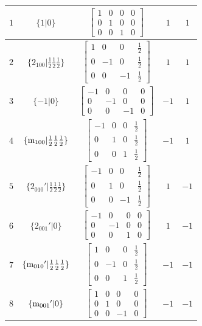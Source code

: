 \documentclass[fleqn,8pt]{jsarticle}
\begin{document}
\begin{longtable}{ccccc}
$ 1 $ & $ \{1|0\} $ & $ \begin{bmatrix} 1 & 0 & 0 & 0 \\ 0 & 1 & 0 & 0 \\ 0 & 0 & 1 & 0 \end{bmatrix} $ & $ 1 $ & $ 1 $ \\ \hline
$ 2 $ & $ \{2{}_{100}|\frac{1}{2} \frac{1}{2} \frac{1}{2}\} $ & $ \begin{bmatrix} 1 & 0 & 0 & \frac{1}{2} \\ 0 & -1 & 0 & \frac{1}{2} \\ 0 & 0 & -1 & \frac{1}{2} \end{bmatrix} $ & $ 1 $ & $ 1 $ \\ \hline
$ 3 $ & $ \{-1|0\} $ & $ \begin{bmatrix} -1 & 0 & 0 & 0 \\ 0 & -1 & 0 & 0 \\ 0 & 0 & -1 & 0 \end{bmatrix} $ & $ -1 $ & $ 1 $ \\ \hline
$ 4 $ & $ \{{\rm m}_{100}|\frac{1}{2} \frac{1}{2} \frac{1}{2}\} $ & $ \begin{bmatrix} -1 & 0 & 0 & \frac{1}{2} \\ 0 & 1 & 0 & \frac{1}{2} \\ 0 & 0 & 1 & \frac{1}{2} \end{bmatrix} $ & $ -1 $ & $ 1 $ \\ \hline
$ 5 $ & $ \{2{}_{010}{}'|\frac{1}{2} \frac{1}{2} \frac{1}{2}\} $ & $ \begin{bmatrix} -1 & 0 & 0 & \frac{1}{2} \\ 0 & 1 & 0 & \frac{1}{2} \\ 0 & 0 & -1 & \frac{1}{2} \end{bmatrix} $ & $ 1 $ & $ -1 $ \\ \hline
$ 6 $ & $ \{2{}_{001}{}'|0\} $ & $ \begin{bmatrix} -1 & 0 & 0 & 0 \\ 0 & -1 & 0 & 0 \\ 0 & 0 & 1 & 0 \end{bmatrix} $ & $ 1 $ & $ -1 $ \\ \hline
$ 7 $ & $ \{{\rm m}_{010}{}'|\frac{1}{2} \frac{1}{2} \frac{1}{2}\} $ & $ \begin{bmatrix} 1 & 0 & 0 & \frac{1}{2} \\ 0 & -1 & 0 & \frac{1}{2} \\ 0 & 0 & 1 & \frac{1}{2} \end{bmatrix} $ & $ -1 $ & $ -1 $ \\ \hline
$ 8 $ & $ \{{\rm m}_{001}{}'|0\} $ & $ \begin{bmatrix} 1 & 0 & 0 & 0 \\ 0 & 1 & 0 & 0 \\ 0 & 0 & -1 & 0 \end{bmatrix} $ & $ -1 $ & $ -1 $ \\
\end{longtable}
\end{document}
